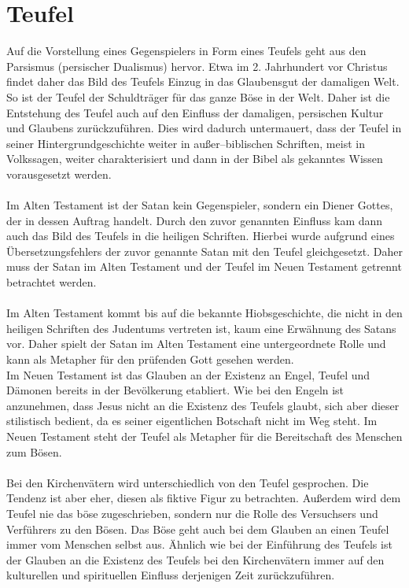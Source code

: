 \section{Teufel}\label{sec:Teufel}
Auf die Vorstellung eines Gegenspielers in Form eines Teufels geht aus den Parsismus (persischer Dualismus) hervor. Etwa im 2. Jahrhundert vor Christus findet daher das Bild des Teufels Einzug in das Glaubensgut der damaligen Welt. So ist der Teufel der Schuldträger für das ganze Böse in der Welt. Daher ist die Entstehung
des Teufel auch auf den Einfluss der damaligen, persischen Kultur und Glaubens zurückzuführen. Dies wird dadurch untermauert, dass der Teufel in seiner Hintergrundgeschichte weiter in außer--biblischen Schriften, meist in Volkssagen, weiter charakterisiert und dann in der Bibel als gekanntes Wissen vorausgesetzt werden.
\\~\\
Im Alten Testament ist der Satan kein Gegenspieler, sondern ein Diener Gottes, der in dessen Auftrag handelt. Durch den zuvor genannten Einfluss kam dann auch das Bild des Teufels in die heiligen Schriften. Hierbei wurde aufgrund eines Übersetzungsfehlers der zuvor genannte Satan mit den Teufel gleichgesetzt.
Daher muss der Satan im Alten Testament und der Teufel im Neuen Testament getrennt betrachtet werden.
\\~\\
Im Alten Testament kommt bis auf die bekannte Hiobsgeschichte, die nicht in den heiligen Schriften des Judentums vertreten ist, kaum eine Erwähnung des Satans vor. Daher spielt der Satan im Alten Testament eine untergeordnete Rolle und kann als Metapher für den prüfenden Gott gesehen werden. \\ Im Neuen Testament ist das Glauben an der Existenz an Engel, Teufel und Dämonen bereits in der Bevölkerung etabliert. Wie bei den Engeln ist anzunehmen, dass Jesus nicht an die Existenz des Teufels glaubt, sich aber dieser stilistisch bedient, da es seiner eigentlichen Botschaft nicht im Weg steht. Im Neuen Testament steht der Teufel als Metapher
für die Bereitschaft  des Menschen zum Bösen.
\\~\\
Bei den Kirchenvätern wird unterschiedlich von den Teufel gesprochen. Die Tendenz ist aber eher, diesen als fiktive Figur zu betrachten. Außerdem wird dem Teufel nie das böse zugeschrieben, sondern nur die Rolle des Versuchsers und Verführers zu den Bösen. Das Böse geht auch bei dem Glauben an einen Teufel immer vom Menschen selbst aus. Ähnlich wie bei der Einführung des Teufels ist der Glauben an die Existenz des Teufels bei den Kirchenvätern immer auf den kulturellen und spirituellen Einfluss derjenigen Zeit zurückzuführen.
